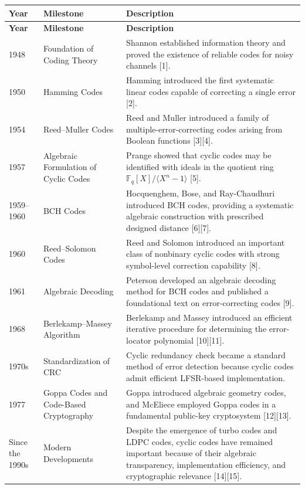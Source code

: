 \documentclass[
]{article}
\begin{document}
\renewcommand{\arraystretch}{1.1}
\begin{longtable}{@{}p{1.8cm}p{3.9cm}>{\raggedright\arraybackslash}p{8.5cm}@{}}
\toprule
\textbf{Year} & \textbf{Milestone} & \textbf{Description} \\
\midrule
\endfirsthead

\toprule
\textbf{Year} & \textbf{Milestone} & \textbf{Description} \\
\midrule
\endhead

\bottomrule
\endfoot

1948
& Foundation of Coding Theory
& Shannon established information theory and proved the existence of reliable codes for noisy channels {[}1{]}. \\

1950
& Hamming Codes
& Hamming introduced the first systematic linear codes capable of correcting a single error {[}2{]}. \\

1954
& Reed--Muller Codes
& Reed and Muller introduced a family of multiple-error-correcting codes arising from Boolean functions {[}3{]}{[}4{]}. \\

1957
& Algebraic Formulation of Cyclic Codes
& Prange showed that cyclic codes may be identified with ideals in the quotient ring \(\mathbb{F}_q[X]/\langle X^n-1\rangle\) {[}5{]}. \\

1959--1960
& BCH Codes
& Hocquenghem, Bose, and Ray-Chaudhuri introduced BCH codes, providing a systematic algebraic construction with prescribed designed distance {[}6{]}{[}7{]}. \\

1960
& Reed--Solomon Codes
& Reed and Solomon introduced an important class of nonbinary cyclic codes with strong symbol-level correction capability {[}8{]}. \\

1961
& Algebraic Decoding
& Peterson developed an algebraic decoding method for BCH codes and published a foundational text on error-correcting codes {[}9{]}. \\

1968
& Berlekamp--Massey Algorithm
& Berlekamp and Massey introduced an efficient iterative procedure for determining the error-locator polynomial {[}10{]}{[}11{]}. \\

1970s
& Standardization of CRC
& Cyclic redundancy check became a standard method of error detection because cyclic codes admit efficient LFSR-based implementation. \\

1977
& Goppa Codes and Code-Based Cryptography
& Goppa introduced algebraic geometry codes, and McEliece employed Goppa codes in a fundamental public-key cryptosystem {[}12{]}{[}13{]}. \\

Since the 1990s
& Modern Developments
& Despite the emergence of turbo codes and LDPC codes, cyclic codes have remained important because of their algebraic transparency, implementation efficiency, and cryptographic relevance {[}14{]}{[}15{]}. \\

\end{longtable}
\end{document}
